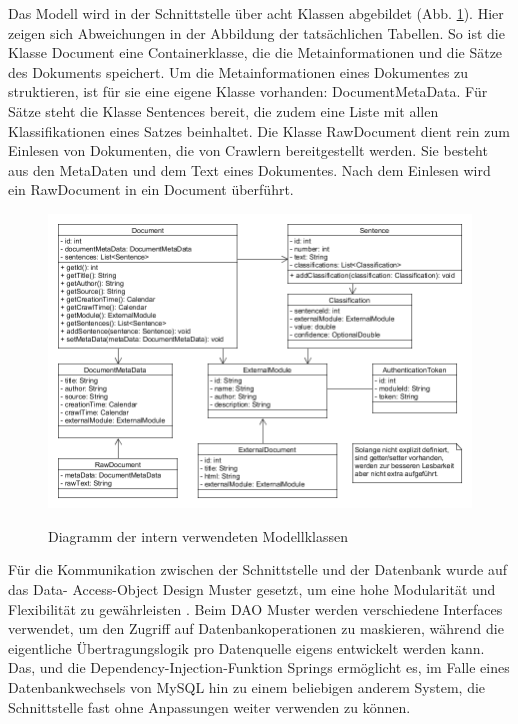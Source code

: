 Das Modell wird in der Schnittstelle über acht Klassen abgebildet (Abb. \ref{uml_model}).
Hier zeigen sich Abweichungen in der Abbildung der tatsächlichen Tabellen. So ist die
Klasse Document eine Containerklasse, die die Metainformationen und die Sätze des
Dokuments speichert. Um die Metainformationen eines Dokumentes zu struktieren, ist für
sie eine eigene Klasse vorhanden: DocumentMetaData. Für Sätze steht die Klasse Sentences
bereit, die zudem eine Liste mit allen Klassifikationen eines Satzes beinhaltet. Die 
Klasse RawDocument dient rein zum Einlesen von Dokumenten, die von Crawlern bereitgestellt
werden. Sie besteht aus den MetaDaten und dem Text eines Dokumentes. Nach dem Einlesen
wird ein RawDocument in ein Document überführt.

\begin{figure}[h]
	\centering
	\includegraphics[scale=0.5]{content/uml-model.png}
	\label{uml_model}
	\caption{Diagramm der intern verwendeten Modellklassen}
\end{figure}

Für die Kommunikation zwischen der Schnittstelle und der Datenbank wurde auf das Data-
Access-Object Design Muster gesetzt, um eine hohe Modularität und Flexibilität zu
gewährleisten \cite{dao-pattern}. Beim DAO Muster werden verschiedene Interfaces
verwendet, um den Zugriff auf Datenbankoperationen zu maskieren, während die eigentliche
Übertragungslogik pro Datenquelle eigens entwickelt werden kann. Das, und die
Dependency-Injection-Funktion Springs ermöglicht es, im Falle eines Datenbankwechsels von
MySQL hin zu einem beliebigen anderem System, die Schnittstelle fast ohne Anpassungen
weiter verwenden zu können.

